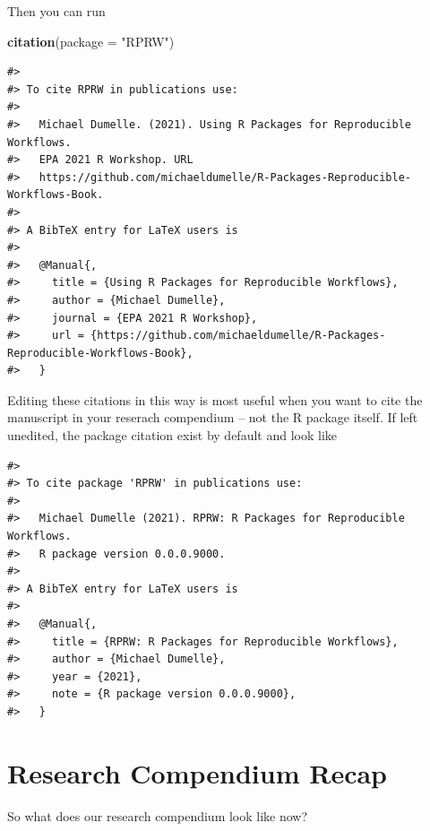 \documentclass[
]{book}
\newenvironment{Shaded}{\begin{snugshade}}{\end{snugshade}}
\newcommand{\DataTypeTok}[1]{\textcolor[rgb]{0.13,0.29,0.53}{#1}}
\newcommand{\KeywordTok}[1]{\textcolor[rgb]{0.13,0.29,0.53}{\textbf{#1}}}
\newcommand{\NormalTok}[1]{#1}
\newcommand{\StringTok}[1]{\textcolor[rgb]{0.31,0.60,0.02}{#1}}
\begin{document}
Then you can run

\begin{Shaded}
\begin{Highlighting}[]
\KeywordTok{citation}\NormalTok{(}\DataTypeTok{package =} \StringTok{"RPRW"}\NormalTok{)}
\end{Highlighting}
\end{Shaded}

\begin{verbatim}
#> 
#> To cite RPRW in publications use:
#> 
#>   Michael Dumelle. (2021). Using R Packages for Reproducible Workflows.
#>   EPA 2021 R Workshop. URL
#>   https://github.com/michaeldumelle/R-Packages-Reproducible-Workflows-Book.
#> 
#> A BibTeX entry for LaTeX users is
#> 
#>   @Manual{,
#>     title = {Using R Packages for Reproducible Workflows},
#>     author = {Michael Dumelle},
#>     journal = {EPA 2021 R Workshop},
#>     url = {https://github.com/michaeldumelle/R-Packages-Reproducible-Workflows-Book},
#>   }
\end{verbatim}

Editing these citations in this way is most useful when you want to cite the manuscript in your reserach compendium -- not the R package itself. If left unedited, the package citation exist by default and look like

\begin{verbatim}
#> 
#> To cite package 'RPRW' in publications use:
#> 
#>   Michael Dumelle (2021). RPRW: R Packages for Reproducible Workflows.
#>   R package version 0.0.0.9000.
#> 
#> A BibTeX entry for LaTeX users is
#> 
#>   @Manual{,
#>     title = {RPRW: R Packages for Reproducible Workflows},
#>     author = {Michael Dumelle},
#>     year = {2021},
#>     note = {R package version 0.0.0.9000},
#>   }
\end{verbatim}

\hypertarget{rc-recap}{%
\section{Research Compendium Recap}\label{rc-recap}}

So what does our research compendium look like now?
\end{document}
